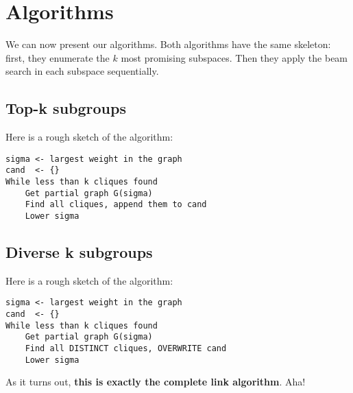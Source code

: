 \section{Algorithms}
We can now present our algorithms. Both algorithms have the same skeleton:
first, they enumerate the $k$ most promising subspaces. Then they apply the
beam search in each subspace sequentially.

\subsection{Top-k subgroups}

Here is a rough sketch of the algorithm:
\begin{verbatim}
sigma <- largest weight in the graph
cand  <- {}
While less than k cliques found
    Get partial graph G(sigma)
    Find all cliques, append them to cand
    Lower sigma
\end{verbatim}

\subsection{Diverse k subgroups}

Here is a rough sketch of the algorithm:
\begin{verbatim}
sigma <- largest weight in the graph
cand  <- {}
While less than k cliques found
    Get partial graph G(sigma)
    Find all DISTINCT cliques, OVERWRITE cand 
    Lower sigma
\end{verbatim}

As it turns out, \textbf{this is exactly the complete link algorithm}. Aha!
